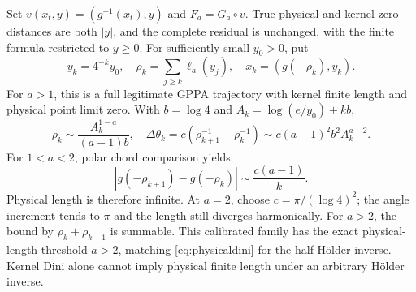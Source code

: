 \documentclass[11pt]{article}
\theoremstyle{remark}
\begin{document}
Set $v(x_t,y)=(g^{-1}(x_t),y)$ and $F_a=G_a\circ v$. True physical
and kernel zero distances are both $|y|$, and the complete residual is
unchanged, with the finite formula restricted to $y\ge0$. For sufficiently small $y_0>0$, put
\begin{equation}
 y_k=4^{-k}y_0,\quad \rho_k=\sum_{j\ge k}\ell_a(y_j),\quad
 x_k=(g(-\rho_k),y_k).
\end{equation}
For $a>1$, this is a full legitimate GPPA trajectory with kernel
finite length and physical point limit zero. With $b=\log4$ and
$A_k=\log(e/y_0)+kb$,
\begin{equation}
 \rho_k\sim\frac{A_k^{1-a}}{(a-1)b},\quad
 \Delta\theta_k=c(\rho_{k+1}^{-1}-\rho_k^{-1})
 \sim c(a-1)^2b^2 A_k^{a-2}.
\end{equation}
For $1<a<2$, polar chord comparison yields
\begin{equation}
 |g(-\rho_{k+1})-g(-\rho_k)|\sim\frac{c(a-1)}k.
\end{equation}
Physical length is therefore infinite. At $a=2$, choose
$c=\pi/(\log4)^2$; the angle increment tends to $\pi$ and the length
still diverges harmonically. For $a>2$, the bound by
$\rho_k+\rho_{k+1}$ is summable. This calibrated family has the exact
physical-length threshold $a>2$, matching \eqref{eq:physicaldini}
for the half-H\"older inverse. Kernel Dini alone cannot imply
physical finite length under an arbitrary H\"older inverse.
\end{document}
